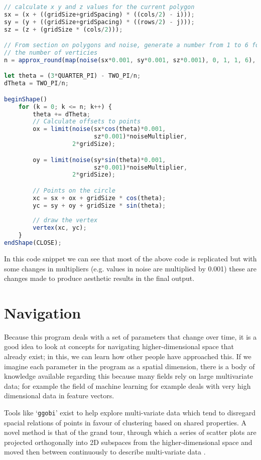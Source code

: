 \begin{lstlisting}[language=JavaScript]
// calculate x y and z values for the current polygon
sx = (x + ((gridSize+gridSpacing) * ((cols/2) - i)));
sy = (y + ((gridSize+gridSpacing) * ((rows/2) - j)));
sz = (z + (gridSize * (cols/2)));

// From section on polygons and noise, generate a number from 1 to 6 for
// the number of verticies
n = approx_round(map(noise(sx*0.001, sy*0.001, sz*0.001), 0, 1, 1, 6), 1);

let theta = (3*QUARTER_PI) - TWO_PI/n;
dTheta = TWO_PI/n;

beginShape()
    for (k = 0; k <= n; k++) {
        theta += dTheta;
        // Calculate offsets to points
        ox = limit(noise(sx*cos(theta)*0.001, 
                         sz*0.001)*noiseMultiplier, 
                   2*gridSize);

        oy = limit(noise(sy*sin(theta)*0.001, 
                         sz*0.001)*noiseMultiplier, 
                   2*gridSize);

        // Points on the circle
        xc = sx + ox + gridSize * cos(theta);
        yc = sy + oy + gridSize * sin(theta);
        
        // draw the vertex
        vertex(xc, yc);
    }
endShape(CLOSE);
\end{lstlisting}

In this code snippet we can see that most of the above code is replicated but
with some changes in multipliers (e.g. values in noise are multiplied by 0.001)
these are changes made to produce aesthetic results in the final output.

\section{Navigation}
Because this program deals with a set of parameters that change over time, it is
a good idea to look at concepts for navigating higher-dimensional space that
already exist; in this, we can learn how other people have approached this. If we
imagine each parameter in the program as a spatial dimension, there is a body of
knowledge available regarding this because many fields rely on large
multivariate data; for example the field of machine learning for example deals
with very high dimensional data in feature vectors.

Tools like `\verb|ggobi|' exist to help explore multi-variate data
\citep{swayne:dsc2003} which tend to disregard spacial relations of points in
favour of clustering based on shared properties. A novel method is that of the
grand tour, through which a series of scatter plots are projected orthogonally
into 2D subspaces from the higher-dimensional space and moved then between
continuously to describe multi-variate data \citep{asimov1985grand}.

